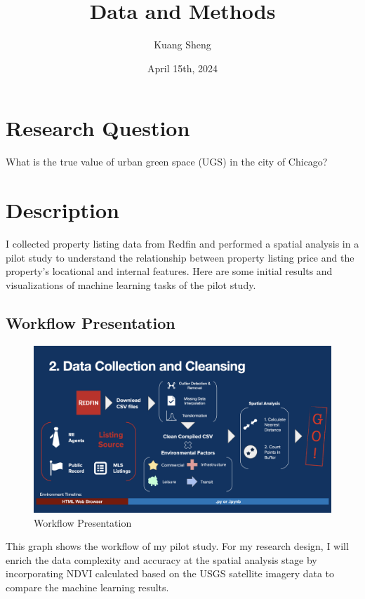 \documentclass{article}
\title{Data and Methods}
\author{Kuang Sheng}
\date{April 15th, 2024}
\begin{document}
\maketitle



\section*{Research Question}
What is the true value of urban green space (UGS) in the city of Chicago?

\section*{Description}
I collected property listing data from Redfin and performed a spatial analysis in a pilot study to understand the relationship between property listing price and the property’s locational and internal features. Here are some initial results and visualizations of machine learning tasks of the pilot study.

\subsection*{Workflow Presentation}
\begin{figure}[h]
  \centering
  \includegraphics[width=\textwidth]{Visual/workflow.jpeg}
  \caption{Workflow Presentation}
\end{figure}

This graph shows the workflow of my pilot study. For my research design, I will enrich the data complexity and accuracy at the spatial analysis stage by incorporating NDVI calculated based on the USGS satellite imagery data to compare the machine learning results.
\end{document}
